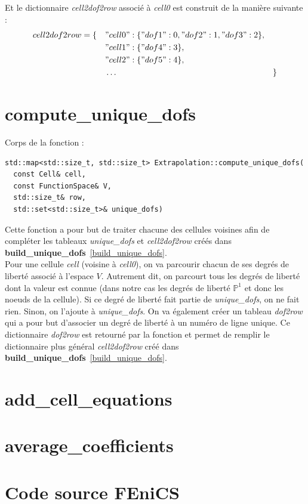 \documentclass[french]{article}
\begin{document}
	Et le dictionnaire \textit{cell2dof2row} associé à \textit{cell0} est construit de la manière suivante :
	$$cell2dof2row = \begin{aligned}[t]
		\{\quad&"cell0":\{"dof1":0,"dof2":1,"dof3":2\},&& \\
		&"cell1":\{"dof4":3\}, \\
		&"cell2":\{"dof5":4\}, \\
		&\dots &&\}
	\end{aligned}$$
	
	
	\section{compute\_unique\_dofs}
	\label{compute_unique_dofs}
	
	Corps de la fonction :
	
	\begin{lstlisting}
std::map<std::size_t, std::size_t> Extrapolation::compute_unique_dofs(
  const Cell& cell,
  const FunctionSpace& V,
  std::size_t& row,
  std::set<std::size_t>& unique_dofs)
	\end{lstlisting}
	
	Cette fonction a pour but de traiter chacune des cellules voisines afin de compléter les tableaux \textit{unique\_dofs} et \textit{cell2dof2row} créés dans \textbf{build\_unique\_dofs}~\ref{build_unique_dofs}.\\
	
	Pour une cellule \textit{cell} (voisine à \textit{cell0}), on va parcourir chacun de ses degrés de liberté associé à l'espace $V$. Autrement dit, on parcourt tous les degrés de liberté dont la valeur est connue (dans notre cas les degrés de liberté $\mathbb{P}^1$ et donc les noeuds de la cellule). Si ce degré de liberté fait partie de \textit{unique\_dofs}, on ne fait rien. Sinon, on l'ajoute à \textit{unique\_dofs}. On va également créer un tableau \textit{dof2row} qui a pour but d'associer un degré de liberté à un numéro de ligne unique. Ce dictionnaire \textit{dof2row} est retourné par la fonction et permet de remplir le dictionnaire plus général \textit{cell2dof2row} créé dans \textbf{build\_unique\_dofs}~\ref{build_unique_dofs}.
	
	\section{add\_cell\_equations}
	\label{add_cell_equations}
	
	\section{average\_coefficients}
	\label{average_coefficients}

	\newpage
	\appendix
	
	\section{Code source FEniCS}
	
	
	
\end{document}
